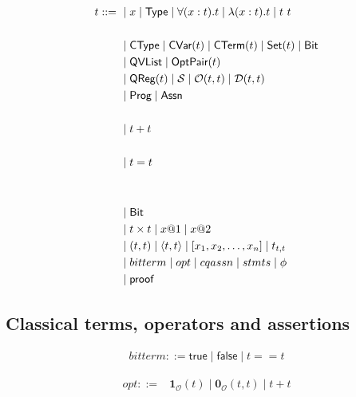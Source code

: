 \newcommand{\ONEO}{\ensuremath{\mathbf{1}_\mathcal{O}}}
\newcommand{\ZEROO}{\ensuremath{\mathbf{0}_\mathcal{O}}}

\newcommand{\true}{\textsf{true}}
\newcommand{\false}{\textsf{false}}

\begin{definition}
    \begin{align*}
        t ::=\ & \mid x \mid \textsf{Type} \mid \forall (x : t). t \mid \lambda (x : t). t \mid t\ t\\
        \\
        & \mid \textsf{CType} \mid \textsf{CVar}(t) \mid \textsf{CTerm}(t) \mid \textsf{Set}(t) \mid \textsf{Bit} \\
        & \mid \textsf{QVList} \mid \textsf{OptPair}(t) \\
        & \mid \textsf{QReg}(t) \mid \mathcal{S} \mid \mathcal{O}(t, t) \mid \mathcal{D}(t, t) \\
        & \mid \textsf{Prog} \mid \textsf{Assn} \\
        \\
        & \mid t + t \\
        \\
        & \mid t = t \\
        \\
        \\
        & \mid \textsf{Bit} \\
        & \mid t \times t \mid  x@1 \mid x@2 \\ 
        & \mid (t, t) \mid \langle t, t \rangle \mid [x_1, x_2, \dots, x_n] \mid t_{t,t} \\
        & \mid bitterm \mid opt \mid cqassn \mid stmts \mid \phi \\
        & \mid \textsf{proof}
    \end{align*}
\end{definition}

\subsection{Classical terms, operators and assertions}

\begin{definition}
    \begin{align*}
        bitterm ::= \true \mid \false \mid t == t
    \end{align*}
\end{definition}

\begin{definition}
    \begin{align*}
        opt ::= & \ONEO(t) \mid \ZEROO(t,t) \mid t + t
    \end{align*}
\end{definition}

